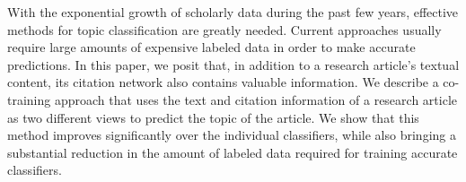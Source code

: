With the exponential growth of scholarly data during the past few years, effective methods for topic classification are greatly needed. Current approaches usually require large amounts of expensive labeled data in order to make accurate predictions. In this paper, we posit that, in addition to a research article's textual content, its citation network also contains valuable information. We describe a co-training approach that uses the text and citation information of a research article as two different views to predict the topic of the article. We show that this method improves significantly over the individual classifiers, while also bringing a substantial reduction in the amount of labeled data required for training accurate classifiers.
